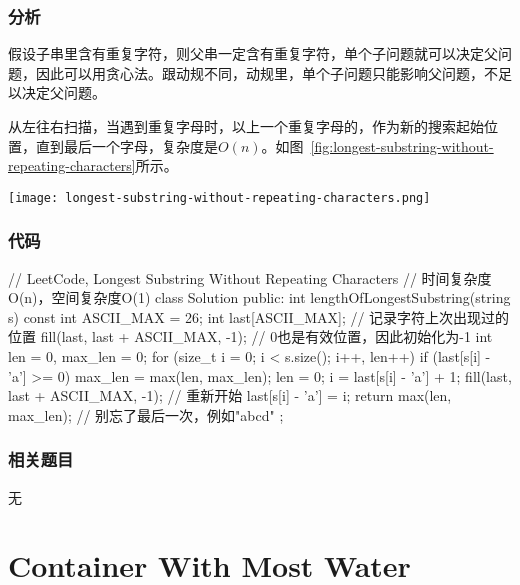 \subsubsection{分析}
假设子串里含有重复字符，则父串一定含有重复字符，单个子问题就可以决定父问题，因此可以用贪心法。跟动规不同，动规里，单个子问题只能影响父问题，不足以决定父问题。

从左往右扫描，当遇到重复字母时，以上一个重复字母的，作为新的搜索起始位置，直到最后一个字母，复杂度是$O(n)$。如图~\ref{fig:longest-substring-without-repeating-characters}所示。

\begin{center}
\texttt{[image: longest-substring-without-repeating-characters.png]}\\
\label{fig:longest-substring-without-repeating-characters}
\end{center}


\subsubsection{代码}
\begin{Code}
// LeetCode, Longest Substring Without Repeating Characters
// 时间复杂度O(n)，空间复杂度O(1)
class Solution {
public:
    int lengthOfLongestSubstring(string s) {
        const int ASCII_MAX = 26;
        int last[ASCII_MAX]; // 记录字符上次出现过的位置
        fill(last, last + ASCII_MAX, -1); // 0也是有效位置，因此初始化为-1
        int len = 0, max_len = 0;
        for (size_t i = 0; i < s.size(); i++, len++) {
            if (last[s[i] - 'a'] >= 0) {
                max_len = max(len, max_len);
                len = 0;
                i = last[s[i] - 'a'] + 1;
                fill(last, last + ASCII_MAX, -1);   // 重新开始
            }
            last[s[i] - 'a'] = i;
        }
        return max(len, max_len);  // 别忘了最后一次，例如"abcd"
    }
};
\end{Code}


\subsubsection{相关题目}
\begindot
\item 无
\myenddot


\section{Container With Most Water}
\label{sec:container-with-most-water}


